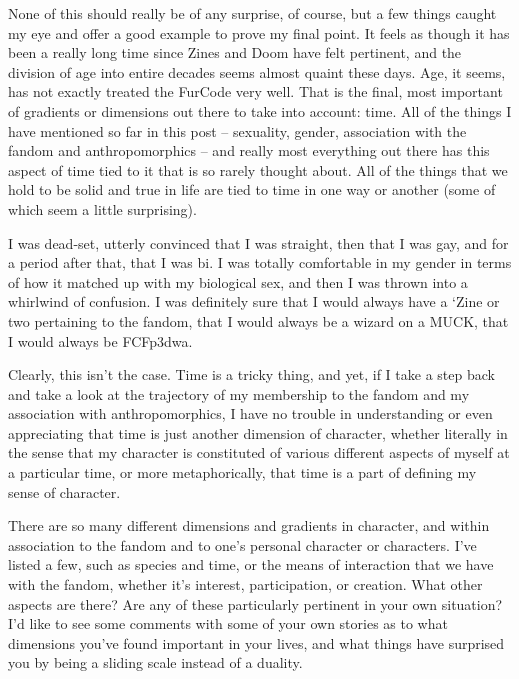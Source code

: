 None of this should really be of any surprise, of course, but a few things caught my eye and offer a good example to prove my final point.  It feels as though it has been a really long time since Zines and Doom have felt pertinent, and the division of age into entire decades seems almost quaint these days.  Age, it seems, has not exactly treated the FurCode very well.  That is the final, most important of gradients or dimensions out there to take into account: time.  All of the things I have mentioned so far in this post -- sexuality, gender, association with the fandom and anthropomorphics -- and really most everything out there has this aspect of time tied to it that is so rarely thought about.  All of the things that we hold to be solid and true in life are tied to time in one way or another (some of which seem a little surprising).

I was dead-set, utterly convinced that I was straight, then that I was gay, and for a period after that, that I was bi.  I was totally comfortable in my gender in terms of how it matched up with my biological sex, and then I was thrown into a whirlwind of confusion.  I was definitely sure that I would always have a ‘Zine or two pertaining to the fandom, that I would always be a wizard on a MUCK, that I would always be FCFp3dwa.

Clearly, this isn't the case.  Time is a tricky thing, and yet, if I take a step back and take a look at the trajectory of my membership to the fandom and my association with anthropomorphics, I have no trouble in understanding or even appreciating that time is just another dimension of character, whether literally in the sense that my character is constituted of various different aspects of myself at a particular time, or more metaphorically, that time is a part of defining my sense of character.

There are so many different dimensions and gradients in character, and within association to the fandom and to one's personal character or characters.  I've listed a few, such as species and time, or the means of interaction that we have with the fandom, whether it's interest, participation, or creation.  What other aspects are there?  Are any of these particularly pertinent in your own situation?  I'd like to see some comments with some of your own stories as to what dimensions you've found important in your lives, and what things have surprised you by being a sliding scale instead of a duality.
